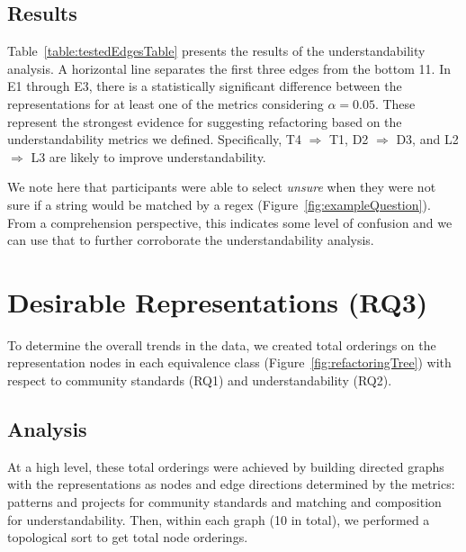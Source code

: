 



\subsection{Results}
Table~\ref{table:testedEdgesTable} presents the results of the understandability analysis. A horizontal line separates the first three edges from the bottom 11. In E1 through E3, there is a statistically significant difference between the representations for at least one of the metrics considering $\alpha = 0.05$.  These represent the strongest evidence for suggesting refactoring based on the understandability metrics we defined. Specifically, T4 $\Rightarrow$ T1, D2 $\Rightarrow$ D3, and L2 $\Rightarrow$ L3 are likely to improve understandability. 

We note here that participants were able to select \emph{unsure} when they were not sure if a string would be matched by a regex (Figure~\ref{fig:exampleQuestion}). From a comprehension perspective, this indicates some level of confusion and we can use that to further corroborate the understandability analysis. 




\section{Desirable Representations (RQ3)}
\label{sec:rq3}
To determine the overall trends in the data, we created total orderings on the representation nodes in each equivalence class (Figure~\ref{fig:refactoringTree})  with respect to community standards (RQ1)  and understandability (RQ2).

\subsection{Analysis}
At a high level, these total orderings were achieved by building directed graphs with the representations as nodes and edge directions determined by the metrics: patterns and projects for community standards and matching and composition for understandability. Then, within each graph (10 in total), we performed a topological sort to get total node orderings.

